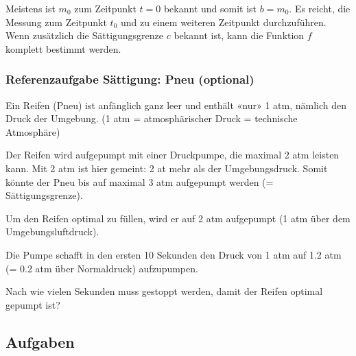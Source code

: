 

\begin{bemerkung}{}{}
Meistens ist $m_0$ zum Zeitpunkt $t=0$ bekannt und somit ist $b=m_0$. Es reicht, die Messung zum Zeitpunkt $t_0$ und zu einem weiteren Zeitpunkt durchzuführen. Wenn zusätzlich die Sättigungsgrenze $c$ bekannt ist, kann die Funktion $f$ komplett bestimmt werden.
\end{bemerkung} 

\newpage
\subsubsection{Referenzaufgabe Sättigung: Pneu (optional)}

Ein Reifen (Pneu) ist anfänglich ganz leer und enthält «nur» 1 atm, nämlich den
Druck der Umgebung. (1 atm = atmosphärischer Druck = technische Atmosphäre) 

Der Reifen wird aufgepumpt mit einer Druckpumpe, die maximal 2 atm
leisten
kann. Mit 2 atm ist hier gemeint: 2 at mehr als der
Umgebungsdruck. Somit könnte der Pneu bis auf maximal 3 atm aufgepumpt
werden (= Sättigungsgrenze).

Um den Reifen optimal zu füllen, wird er auf 2 atm aufgepumpt (1 atm
über dem Umgebungsluftdruck).

Die Pumpe schafft in den ersten 10 Sekunden den Druck von 1 atm auf 1.2
atm (= 0.2 atm über Normaldruck) aufzupumpen.

Nach wie vielen Sekunden muss gestoppt werden, damit der Reifen
optimal gepumpt ist?

\newpage

\subsection*{Aufgaben}

